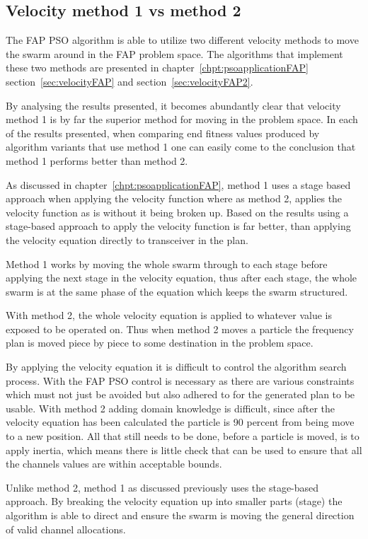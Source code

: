 \subsection{Velocity method 1 vs method 2}
The FAP PSO algorithm is able to utilize two different velocity methods to move the swarm around in the FAP problem space. The algorithms that implement these two methods are presented in chapter~\ref{chpt:psoapplicationFAP} section~\ref{sec:velocityFAP} and section~\ref{sec:velocityFAP2}.

By analysing the results presented, it becomes abundantly clear that velocity method 1 is by far the superior method for moving in the problem space. In each of the results presented, when comparing end fitness values produced by algorithm variants that use method 1 one can easily come to the conclusion that method 1 performs better than method 2.

As discussed in chapter~\ref{chpt:psoapplicationFAP}, method 1 uses a stage based approach when applying the velocity function where as method 2, applies the velocity function as is without it being broken up. Based on the results using a stage-based approach to apply the velocity function is far better, than applying the velocity equation directly to transceiver in the plan.

Method 1 works by moving the whole swarm through to each stage before applying the next stage in the velocity equation, thus after each stage, the whole swarm is at the same phase of the equation which keeps the swarm structured.

With method 2, the whole velocity equation is applied to whatever value is exposed to be operated on. Thus when method 2 moves a particle the frequency plan is moved piece by piece to some destination in the problem space.

By applying the velocity equation it is difficult to control the algorithm search process. With the FAP PSO control is necessary as there are various constraints which must not just be avoided but also adhered to for the generated plan to be usable. With method 2 adding domain knowledge is difficult, since after the velocity equation has been calculated the particle is 90 percent from being move to a new position. All that still needs to be done, before a particle is moved, is to apply inertia, which means there is little check that can be used to ensure that all the channels values are within acceptable bounds.

Unlike method 2, method 1 as discussed previously uses the stage-based approach. By breaking the velocity equation up into smaller parts (stage) the algorithm is able to direct and ensure the swarm is moving the general direction of valid channel allocations.

